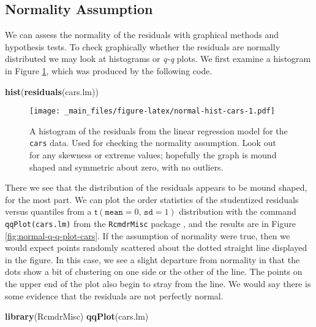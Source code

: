 \documentclass[]{book}
\newenvironment{Shaded}{\begin{snugshade}}{\end{snugshade}}
\newcommand{\KeywordTok}[1]{\textcolor[rgb]{0.13,0.29,0.53}{\textbf{{#1}}}}
\newcommand{\NormalTok}[1]{{#1}}
\numberwithin{equation}{chapter}
\numberwithin{figure}{chapter}
\theoremstyle{plain}
\theoremstyle{definition}
\theoremstyle{remark}
\theoremstyle{definition}
\theoremstyle{definition}
\theoremstyle{remark}
\begin{document}
\subsection{Normality Assumption}\label{sub-normality-assumption}

We can assess the normality of the residuals with graphical methods and
hypothesis tests. To check graphically whether the residuals are
normally distributed we may look at histograms or \emph{q-q} plots. We
first examine a histogram in Figure \ref{fig:normal-hist-cars}, which
was produced by the following code.

\begin{Shaded}
\begin{Highlighting}[]
\KeywordTok{hist}\NormalTok{(}\KeywordTok{residuals}\NormalTok{(cars.lm))}
\end{Highlighting}
\end{Shaded}

\begin{figure}[htbp]
\centering
\texttt{[image: \_main\_files/figure-latex/normal-hist-cars-1.pdf]}
\caption{\label{fig:normal-hist-cars}\small A histogram of the residuals from the
linear regression model for the \texttt{cars} data. Used for checking
the normality assumption. Look out for any skewness or extreme values;
hopefully the graph is mound shaped and symmetric about zero, with no
outliers.}
\end{figure}







There we see that the distribution of the residuals appears to be mound
shaped, for the most part. We can plot the order statistics of the
studentized residuals versus quantiles from a
\(\mathsf{t}(\mathtt{mean}=0,\,\mathtt{sd}=1)\) distribution with the
command \texttt{qqPlot(cars.lm)} from the \texttt{RcmdrMisc} package
\autocite{RcmdrMisc}, and the results are in Figure
\ref{fig:normal-q-q-plot-cars}. If the assumption of normality were
true, then we would expect points randomly scattered about the dotted
straight line displayed in the figure. In this case, we see a slight
departure from normality in that the dots show a bit of clustering on
one side or the other of the line. The points on the upper end of the
plot also begin to stray from the line. We would say there is some
evidence that the residuals are not perfectly normal.

\begin{Shaded}
\begin{Highlighting}[]
\KeywordTok{library}\NormalTok{(RcmdrMisc)}
\KeywordTok{qqPlot}\NormalTok{(cars.lm)}
\end{Highlighting}
\end{Shaded}
\end{document}

